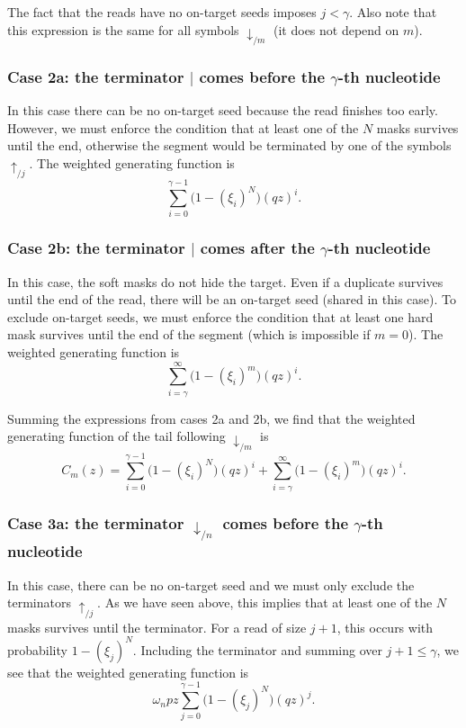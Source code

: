 \documentclass{article}
\begin{document}
The fact that the reads have no on-target seeds imposes $j < \gamma$. Also
note that this expression is the same for all symbols $\downarrow_{/m}$
(it does not depend on $m$).

\subsubsection*{Case 2a: the terminator $|$ comes before the $\gamma$-th
nucleotide}

In this case there can be no on-target seed because the read finishes too
early. However, we must enforce the condition that at least one of the $N$
masks survives until the end, otherwise the segment would be terminated by
one of the symbols $\uparrow_{/j}$. The weighted generating function is
\begin{equation*}
\sum_{i=0}^{\gamma-1} \Big(1 - (\xi_i)^N \Big) (qz)^i.
\end{equation*}

\subsubsection*{Case 2b: the terminator $|$ comes after the $\gamma$-th
nucleotide}

In this case, the soft masks do not hide the target. Even if a duplicate
survives until the end of the read, there will be an on-target seed
(shared in this case). To exclude on-target seeds, we must enforce the
condition that at least one hard mask survives until the end of the
segment (which is impossible if $m = 0$). The weighted generating function
is
\begin{equation*}
\sum_{i=\gamma}^\infty \Big(1 - (\xi_i)^m \Big) (qz)^i.
\end{equation*}

Summing the expressions from cases 2a and 2b, we find that the
weighted generating function of the tail following $\downarrow_{/m}$ is
\begin{equation}
\label{eq:C}
C_m(z) =
\sum_{i=0}^{\gamma-1} \Big(1 - (\xi_i)^N \Big) (qz)^i +
  \sum_{i=\gamma}^\infty \Big(1 - (\xi_i)^m \Big) (qz)^i.
\end{equation}

\subsubsection*{Case 3a: the terminator $\downarrow_{/n}$ comes before the
$\gamma$-th nucleotide}

In this case, there can be no on-target seed and we must only exclude the
terminators $\uparrow_{/j}$. As we have seen above, this implies that at
least one of the $N$ masks survives until the terminator. For a read of
size $j+1$, this occurs with probability $1-(\xi_j)^N$. Including the
terminator and summing over $j+1 \leq \gamma$, we see that the weighted
generating function is
\begin{equation}
\omega_n pz \sum_{j=0}^{\gamma-1} \Big(1 - (\xi_j)^N \Big) (qz)^j.
\end{equation}
\end{document}
